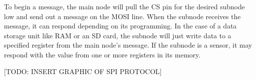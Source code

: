 To begin a message, the main node will pull the CS pin for the desired subnode low and send out a message on the MOSI line.
When the subnode receives the message, it can respond depending on its programming.
In the case of a data storage unit like RAM or an SD card, the subnode will just write data to a specified register from the main node's message.
If the subnode is a sensor, it may respond with the value from one or more registers in its memory.

[TODO: INSERT GRAPHIC OF SPI PROTOCOL]
